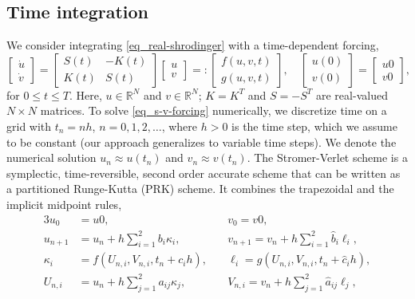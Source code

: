 \documentclass[11pt]{article}
\begin{document}
\subsection{Time integration}
We consider integrating \eqref{eq_real-shrodinger} with a time-dependent forcing,
\begin{equation}\label{eq_s-v-forcing}
  \begin{bmatrix} \dot{u}\\ \dot{v} \end{bmatrix} =
%
  \begin{bmatrix}
    S(t) & -K(t) \\ K(t) & S(t)
  \end{bmatrix}     
  \begin{bmatrix} u\\ v \end{bmatrix}
  =:
%
  \begin{bmatrix}
    f(u,v,t)\\
    g(u,v,t)
  \end{bmatrix},\quad
  \begin{bmatrix}
    u(0)\\
    v(0)
  \end{bmatrix}
  =
    \begin{bmatrix}
    u0\\
    v0
  \end{bmatrix},
%
\end{equation}
for $0 \leq t \leq T$. Here, $u\in \mathbb{R}^N$ and $v\in \mathbb{R}^N$; $K=K^T$ and $S=-S^T$ are real-valued $N\times N$
matrices.  To solve \eqref{eq_s-v-forcing} numerically, we discretize time on a grid with
$t_n = nh$, $n=0,1,2,\ldots$, where $h>0$ is the time step, which we assume to be constant (our approach
generalizes to variable time steps). We denote the numerical solution $u_n\approx u(t_n)$ and $v_n\approx v(t_n)$.  The
Stromer-Verlet scheme is a symplectic, time-reversible, second order accurate scheme that can be written as a
partitioned Runge-Kutta (PRK) scheme. It combines the trapezoidal and the implicit midpoint rules,
\begin{alignat}{3}
  u_0 &= u0,\quad & v_0 = v0,\\
  u_{n+1} &= u_n + h \sum_{i=1}^2 b_i \kappa_i,\quad
  &v_{n+1} = v_n + h \sum_{i=1}^2 \hat{b}_i \ell_i,\label{eq_uv-update}\\
  \kappa_i &= f(U_{n,i}, V_{n,i}, t_n + c_i h),\quad
  &\ell_i = g(U_{n,i}, V_{n,i}, t_n + \hat{c}_i h),\\
  U_{n,i} &= u_n + h \sum_{j=1}^2 a_{ij} \kappa_j,\quad
  &V_{n,i} = v_n + h \sum_{j=1}^2 \hat{a}_{ij} \ell_j,\label{eq_stage-values}
\end{alignat}
\end{document}
